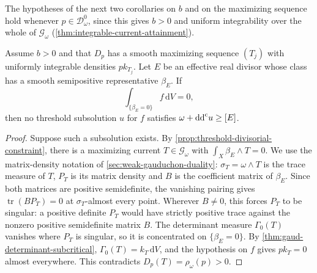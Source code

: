 The hypotheses of the next two corollaries on $b$ and on the maximizing sequence hold whenever $p\in\mathcal D_\omega^0$, since this gives $b>0$ and uniform integrability over the whole of $\mathscr G_\omega$ (\cref{thm:integrable-current-attainment}).

\begin{corollary}\label{cor:semipositive-divisor-exclusion}
Assume $b>0$ and that $D_p$ has a smooth maximizing sequence $(T_j)$ with uniformly integrable densities $p k_{T_j}$. Let $E$ be an effective real divisor whose class has a smooth semipositive representative $\beta_E$. If
\[
 \int_{\{\beta_E=0\}}f\,\mathrm{d}V=0,
\]
then no threshold subsolution $u$ for $f$ satisfies $\omega+\mathrm{dd}^{\mathrm{c}} u\geq[E]$.
\end{corollary}
\begin{proof}
Suppose such a subsolution exists. By \cref{prop:threshold-divisorial-constraint}, there is a maximizing current $T\in\mathscr G_\omega$ with $\int_X\beta_E\wedge T=0$. We use the matrix-density notation of \cref{sec:weak-gauduchon-duality}: $\sigma_T=\omega\wedge T$ is the trace measure of $T$, $P_T$ is its matrix density and $B$ is the coefficient matrix of $\beta_E$. Since both matrices are positive semidefinite, the vanishing pairing gives $\operatorname{tr}(BP_T)=0$ at $\sigma_T$-almost every point. Wherever $B\ne0$, this forces $P_T$ to be singular: a positive definite $P_T$ would have strictly positive trace against the nonzero positive semidefinite matrix $B$. The determinant measure $\Gamma_0(T)$ vanishes where $P_T$ is singular, so it is concentrated on $\{\beta_E=0\}$. By \cref{thm:gaud-determinant-subcritical}, $\Gamma_0(T)=k_T\,\mathrm{d}V$, and the hypothesis on $f$ gives $p k_T=0$ almost everywhere. This contradicts $D_p(T)=\rho_\omega(p)>0$.
\end{proof}
